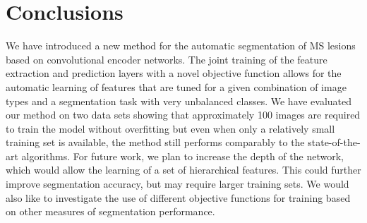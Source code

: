 \section{Conclusions}

We have introduced a new method for the automatic segmentation of MS lesions
based on convolutional encoder networks. The joint training of the feature
extraction and prediction layers with a novel objective function allows for the
automatic learning of features that are tuned for a given combination of image
types and a segmentation task with very unbalanced classes.
We have evaluated our method on two data sets showing that approximately 100
images are required to train the model without overfitting but even when only a
relatively small training set is available, the method still performs comparably
to the state-of-the-art algorithms. For future work, we plan to increase the
depth of the network, which would allow the learning of a set of hierarchical
features. This could further improve segmentation accuracy, but may require
larger training sets. We would also like to investigate the use of different
objective functions for training based on other measures of segmentation
performance.



